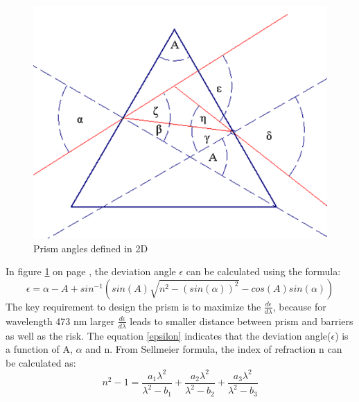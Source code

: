 \begin{figure}[ht!]
\centering
\includegraphics[scale = 0.6]{chapters/img/Prism2D.png}
\caption{Prism angles defined in 2D}
\label{fig:prism2D}
\end{figure} 
In figure \ref{fig:prism2D} on page \pageref{fig:prism2D}, the deviation angle $\epsilon$ can be calculated using the formula\cite{prism_angle_calculation}:
\begin{equation}
\label{epsilon}
\epsilon = \alpha - A + sin^{-1}(sin(A)\sqrt{n^2 - (sin(\alpha))^2} - cos(A)sin(\alpha))
\end {equation}
The key requirement to design the prism is to maximize the $\frac{d\epsilon}{d\lambda}$,  because for wavelength 473 nm larger $\frac{d\epsilon}{d\lambda}$ leads to smaller distance between prism and barriers as well as the risk. The equation \ref{epsilon} indicates that the deviation angle($\epsilon$) is a function of A, $\alpha$ and n. From Sellmeier formula\cite{prism_book}, the index of refraction n can be calculated as:
\begin{equation}
\label{index_refraction}
n^2 - 1 = \frac{a_{1}\lambda^2}{\lambda^2-b_{1}} + \frac{a_{2}\lambda^2}{\lambda^2-b_{2}} + \frac{a_{3}\lambda^2}{\lambda^2-b_{3}}
\end {equation}
